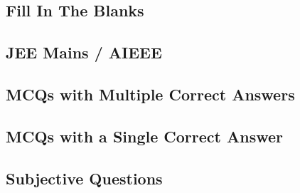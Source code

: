\subsection*{Fill In The Blanks}
\begin{enumerate}[label=\thesubsection.\arabic*,ref=\thesubsection.\theenumi]




\end{enumerate}
\subsection*{JEE Mains / AIEEE}
\begin{enumerate}[label=\thesubsection.\arabic*,ref=\thesubsection.\theenumi]




\end{enumerate}
\subsection*{MCQs with Multiple Correct Answers}
\begin{enumerate}[label=\thesubsection.\arabic*,ref=\thesubsection.\theenumi]




\end{enumerate}
\subsection*{MCQs with a Single Correct Answer}
\begin{enumerate}[label=\thesubsection.\arabic*,ref=\thesubsection.\theenumi]





\end{enumerate}
\subsection*{Subjective Questions}
\begin{enumerate}[label=\thesubsection.\arabic*,ref=\thesubsection.\theenumi]





\end{enumerate}
